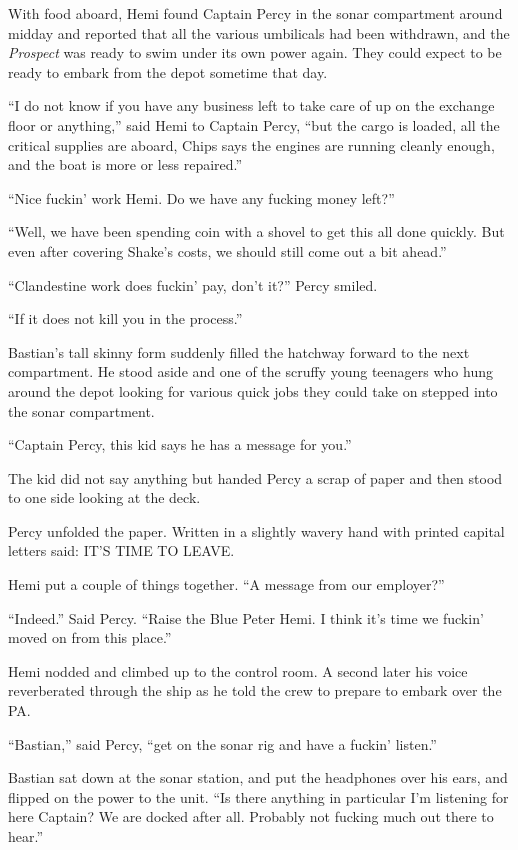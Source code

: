 \documentclass[
]{scrbook}
\begin{document}
With food aboard, Hemi found Captain Percy in the sonar compartment
around midday and reported that all the various umbilicals had been
withdrawn, and the \emph{Prospect} was ready to swim under its own power
again. They could expect to be ready to embark from the depot sometime
that day.

``I do not know if you have any business left to take care of up on the
exchange floor or anything,'' said Hemi to Captain Percy, ``but the
cargo is loaded, all the critical supplies are aboard, Chips says the
engines are running cleanly enough, and the boat is more or less
repaired.''

``Nice fuckin' work Hemi. Do we have any fucking money left?''

``Well, we have been spending coin with a shovel to get this all done
quickly. But even after covering Shake's costs, we should still come out
a bit ahead.''

``Clandestine work does fuckin' pay, don't it?'' Percy smiled.

``If it does not kill you in the process.''

Bastian's tall skinny form suddenly filled the hatchway forward to the
next compartment. He stood aside and one of the scruffy young teenagers
who hung around the depot looking for various quick jobs they could take
on stepped into the sonar compartment.

``Captain Percy, this kid says he has a message for you.''

The kid did not say anything but handed Percy a scrap of paper and then
stood to one side looking at the deck.

Percy unfolded the paper. Written in a slightly wavery hand with printed
capital letters said: IT'S TIME TO LEAVE.

Hemi put a couple of things together. ``A message from our employer?''

``Indeed.'' Said Percy. ``Raise the Blue Peter Hemi. I think it's time
we fuckin' moved on from this place.''

Hemi nodded and climbed up to the control room. A second later his voice
reverberated through the ship as he told the crew to prepare to embark
over the PA.

``Bastian,'' said Percy, ``get on the sonar rig and have a fuckin'
listen.''

Bastian sat down at the sonar station, and put the headphones over his
ears, and flipped on the power to the unit. ``Is there anything in
particular I'm listening for here Captain? We are docked after all.
Probably not fucking much out there to hear.''
\end{document}
